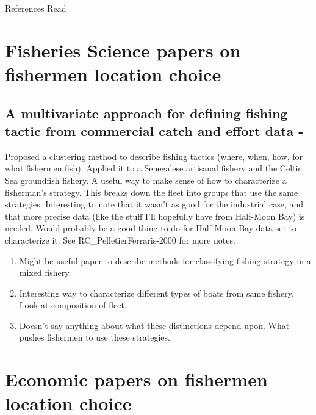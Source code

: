\documentclass[a4paper,10pt]{article}
\begin{document}
{\Huge References Read}

\section*{Fisheries Science papers on fishermen location choice}

\subsection*{A multivariate approach for defining fishing tactic from commercial catch and effort data - \cite{PelletierFerraris:2000}}

Proposed a clustering method to describe fishing tactics (where, when, how, for what fishermen fish). Applied it to a Senegalese artisanal fishery and the Celtic Sea groundfish fishery. A useful way to make sense of how to characterize a fisherman's strategy. This breaks down the fleet into groups that use the same strategies. Interesting to note that it wasn't as good for the industrial case, and that more precise data (like the stuff I'll hopefully have from Half-Moon Bay) is needed. Would probably be a good thing to do for Half-Moon Bay data set to characterize it. See RC\_PelletierFerraris-2000 for more notes. 

\begin{enumerate}
\item Might be useful paper to describe methods for classifying fishing strategy in a mixed fishery. 
\item Interesting way to characterize different types of boats from same fishery. Look at composition of fleet. 
\item Doesn't say anything about what these distinctions depend upon. What pushes fishermen to use these strategies. 
\end{enumerate}

\section*{Economic papers on fishermen location choice}


\printindex



\end{document}
